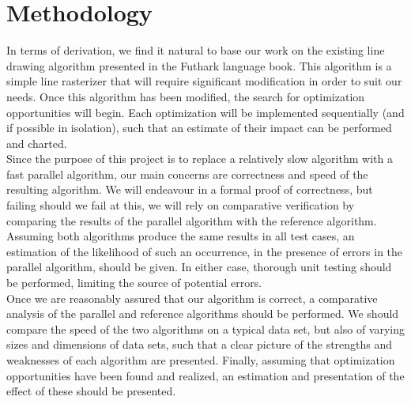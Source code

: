 \section{Methodology}
In terms of derivation, we find it natural to base our work on the existing line drawing algorithm presented in the Futhark language book. This algorithm is a simple line rasterizer that will require significant modification in order to suit our needs. Once this algorithm has been modified, the search for optimization opportunities will begin. Each optimization will be implemented sequentially (and if possible in isolation), such that an estimate of their impact can be performed and charted.\\

Since the purpose of this project is to replace a relatively slow algorithm with a fast parallel algorithm, our main concerns are correctness and speed of the resulting algorithm. We will endeavour in a formal proof of correctness, but failing should we fail at this, we will rely on comparative verification by comparing the results of the parallel algorithm with the reference algorithm. Assuming both algorithms produce the same results in all test cases, an estimation of the likelihood of such an occurrence, in the presence of errors in the parallel algorithm, should be given. In either case, thorough unit testing should be performed, limiting the source of potential errors. 
\\

Once we are reasonably assured that our algorithm is correct, a comparative analysis of the parallel and reference algorithms should be performed. We should compare the speed of the two algorithms on a typical data set, but also of varying sizes and dimensions of data sets, such that a clear picture of the  strengths and weaknesses of each algorithm are presented. Finally, assuming that optimization opportunities have been found and realized, an estimation and presentation of the effect of these should be presented. 



